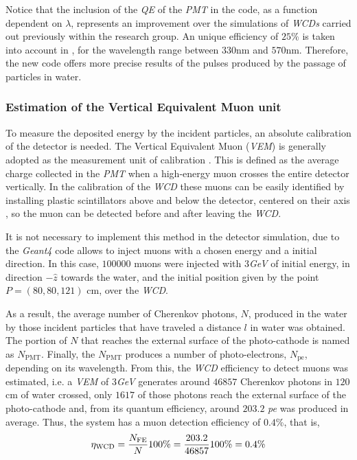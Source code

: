 \documentclass[submitting]{nst}
\begin{document}
Notice that the inclusion of the \textsl{QE} of the \textsl{PMT} in the code, as a function dependent on $\lambda$, represents an improvement over the simulations of \textsl{WCDs} carried out previously within the research group. An unique efficiency of $25$\% is taken into account in \cite{CalderonAsoreyNunez2015}, for the wavelength range between $330$nm and $570$nm. Therefore, the new code offers more precise results of the pulses produced by the passage of particles in water. 
 
 \subsubsection{Estimation of the Vertical Equivalent Muon unit}
 To measure the deposited energy by the incident particles, an absolute calibration of the detector is needed. The Vertical Equivalent Muon (\textsl{VEM}) is generally adopted as the measurement unit of calibration \cite{EtchegoyenEtal2005}. This is defined as the average charge collected in the \textsl{PMT} when a high-energy muon crosses the entire detector vertically. In the calibration of the \textsl{WCD} these muons can be easily identified by installing plastic scintillators above and below the detector, centered on their axis \cite{EtchegoyenEtal2005}, so the muon can be detected before and after leaving the \textsl{WCD}.
 
It is not necessary to implement this method in the detector simulation, due to the \textsl{Geant4} code allows to inject muons with a chosen energy and a initial direction. In this case, $100000$ muons were injected with $3$\textsl{GeV}   of initial energy, in direction $-\hat{z}$ towards the water, and the initial position given by the point $ P=(80, 80, 121)$ cm, over the \textsl{WCD}. 

As a result, the average number of Cherenkov photons, $N$, produced in the water by those incident particles that have traveled a distance $l$ in water was obtained. The portion of $N$ that reaches the external surface of the photo-cathode is named as $N_{\mathrm{PMT}}$. Finally, the $ N_{\mathrm{PMT}}$ produces a number of photo-electrons, $N_{\mathrm{pe}}$, depending on its wavelength. From this, the \textsl{WCD} efficiency to detect muons was estimated, i.e. a \textsl{VEM} of $3$\textsl{GeV} generates around $46857$ Cherenkov photons in $120$cm of water crossed, only $1617$ of those photons reach the external surface of the photo-cathode and, from its quantum efficiency, around $203.2$ \textsl{pe} was produced in average. Thus, the system has a muon detection efficiency of $0.4$\%, that is,
\begin{equation}
\eta_{\mathrm{WCD}}=\frac{N_{\mathrm{FE}}}{N} 100\%=\frac{203.2}{46857}100\%=0\textnormal{.}4\%
\end{equation}
\end{document}
